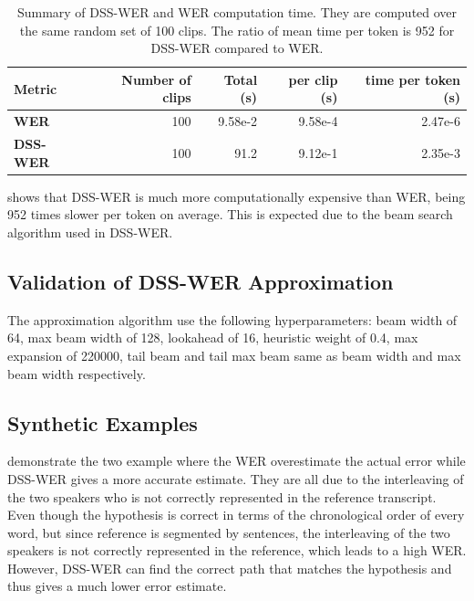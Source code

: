 \begin{table}[htbp]
\centering
\caption{Summary of DSS-WER and WER computation time. They are computed over the same random set of 100 clips. The ratio of mean time per token is 952 for DSS-WER compared to WER.}
\label{tab:dss_wer_timing_efficiency}
\footnotesize
\setlength{\tabcolsep}{4pt}
\begin{tabular}{lrrrr}
\toprule
\textbf{Metric} & \textbf{Number of clips} & \textbf{Total (s)} & \textbf{per clip (s)} & \textbf{time per token (s)} \\
\midrule
\textbf{WER} & 100 & 9.58e-2 & 9.58e-4 & 2.47e-6 \\
\textbf{DSS-WER} & 100 & 91.2 & 9.12e-1 & 2.35e-3 \\

\bottomrule
\end{tabular}
\setlength{\tabcolsep}{6pt}
\normalsize
\end{table}

 shows that DSS-WER is much more computationally expensive than WER, being 952 times slower per token on average. This is expected due to the beam search algorithm used in DSS-WER.

\subsection{Validation of DSS-WER Approximation}
The approximation algorithm use the following hyperparameters: beam width of 64, max beam width of 128, lookahead of 16, heuristic weight of 0.4, max expansion of 220000, tail beam and tail max beam same as beam width and max beam width respectively.


\subsection{Synthetic Examples}
\label{sec:synthetic_examples}
 demonstrate the two example where the WER overestimate the actual error while DSS-WER gives a more accurate estimate. They are all due to the interleaving of the two speakers who is not correctly represented in the reference transcript. Even though the hypothesis is correct in terms of the chronological order of every word, but since reference is segmented by sentences, the interleaving of the two speakers is not correctly represented in the reference, which leads to a high WER. However, DSS-WER can find the correct path that matches the hypothesis and thus gives a much lower error estimate.

